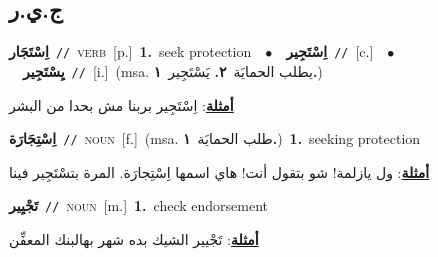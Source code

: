 \documentclass[10pt,a4paper,twoside]{article} %
\begin{document}
\begin{multicols}{2}
\vspace{-3mm}
\subsection*{\color{blue}\foreignlanguage{arabic}{ج.ي.ر}\color{blue}{}} 

{\setlength\topsep{0pt}\textbf{\foreignlanguage{arabic}{اِسْتَجَار}}\ {\color{gray}\texttt{//}\color{black}}\ \textsc{verb}\ [p.]\ \textbf{1.}~seek protection\ \ $\bullet$\ \ \setlength\topsep{0pt}\textbf{\foreignlanguage{arabic}{اِسْتَجِير}}\ {\color{gray}\texttt{//}\color{black}}\ [c.]\ \ $\bullet$\ \ \setlength\topsep{0pt}\textbf{\foreignlanguage{arabic}{يِسْتَجِير}}\ {\color{gray}\texttt{//}\color{black}}\ [i.]\ \color{gray}(msa. \foreignlanguage{arabic}{يطلب الحمايَة}~\foreignlanguage{arabic}{\textbf{٢.}}  \foreignlanguage{arabic}{يَسْتَجِير}~\foreignlanguage{arabic}{\textbf{١.}})\color{black}\  \begin{flushright}\color{gray}\foreignlanguage{arabic}{\textbf{\underline{\foreignlanguage{arabic}{أمثلة}}}: اِسْتَجِير بربنا مش بحدا من البشر}\end{flushright}\color{black}} \vspace{2mm}

{\setlength\topsep{0pt}\textbf{\foreignlanguage{arabic}{اِسْتِجَارَة}}\ {\color{gray}\texttt{//}\color{black}}\ \textsc{noun}\ [f.]\ \color{gray}(msa. \foreignlanguage{arabic}{طلب الحمايَة}~\foreignlanguage{arabic}{\textbf{١.}})\color{black}\ \textbf{1.}~seeking protection\  \begin{flushright}\color{gray}\foreignlanguage{arabic}{\textbf{\underline{\foreignlanguage{arabic}{أمثلة}}}: ول يازلمة! شو بتقول أنت! هاي اسمها اِسْتِجارَة. المرة بتسْتَجِير فينا}\end{flushright}\color{black}} \vspace{2mm}

{\setlength\topsep{0pt}\textbf{\foreignlanguage{arabic}{تَجْيِير}}\ {\color{gray}\texttt{//}\color{black}}\ \textsc{noun}\ [m.]\ \textbf{1.}~check endorsement\  \begin{flushright}\color{gray}\foreignlanguage{arabic}{\textbf{\underline{\foreignlanguage{arabic}{أمثلة}}}: تَجْيير الشيك بده شهر بهالبنك المعفِّن}\end{flushright}\color{black}} \vspace{2mm}


\end{multicols}
\end{document}
